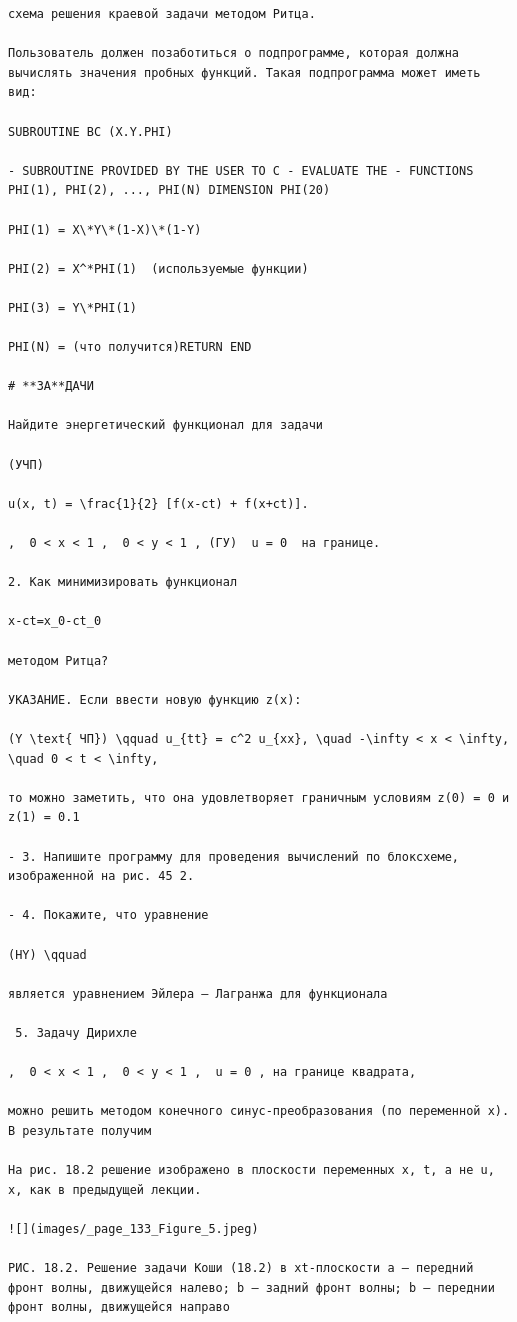 \documentclass[
  ukrainian,
]{article}
\begin{document}
\begin{verbatim}
схема решения краевой задачи методом Ритца.

Пользователь должен позаботиться о подпрограмме, которая должна вычислять значения пробных функций. Такая подпрограмма может иметь вид:

SUBROUTINE BC (X.Y.PHI)

- SUBROUTINE PROVIDED BY THE USER TO C - EVALUATE THE - FUNCTIONS PHI(1), PHI(2), ..., PHI(N) DIMENSION PHI(20)

PHI(1) = X\*Y\*(1-X)\*(1-Y)

PHI(2) = X^*PHI(1)  (используемые функции)

PHI(3) = Y\*PHI(1)

PHI(N) = (что получится)RETURN END

# **ЗА**ДАЧИ

Найдите энергетический функционал для задачи

(УЧП)

u(x, t) = \frac{1}{2} [f(x-ct) + f(x+ct)].

,  0 < x < 1 ,  0 < y < 1 , (ГУ)  u = 0  на границе.

2. Как минимизировать функционал

x-ct=x_0-ct_0

методом Ритца?

УКАЗАНИЕ. Если ввести новую функцию z(x):

(Y \text{ ЧП}) \qquad u_{tt} = c^2 u_{xx}, \quad -\infty < x < \infty, \quad 0 < t < \infty,

то можно заметить, что она удовлетворяет граничным условиям z(0) = 0 и z(1) = 0.1

- 3. Напишите программу для проведения вычислений по блоксхеме, изображенной на рис. 45 2.

- 4. Покажите, что уравнение

(HY) \qquad

является уравнением Эйлера — Лагранжа для функционала

 5. Задачу Дирихле

,  0 < x < 1 ,  0 < y < 1 ,  u = 0 , на границе квадрата,

можно решить методом конечного синус-преобразования (по переменной х). В результате получим

На рис. 18.2 решение изображено в плоскости переменных x, t, а не u, x, как в предыдущей лекции.

![](images/_page_133_Figure_5.jpeg)

РИС. 18.2. Решение задачи Коши (18.2) в xt-плоскости a — передний фронт волны, движущейся налево; b — задний фронт волны; b — переднии фронт волны, движущейся направо


\end{verbatim}
\end{document}
